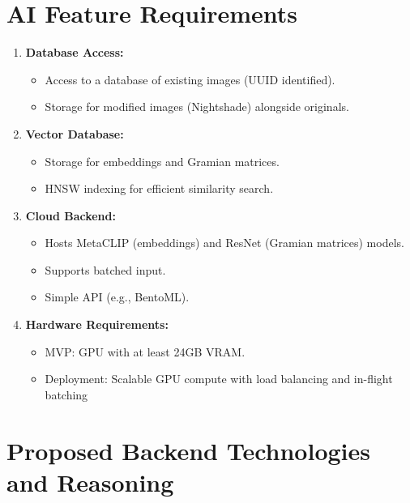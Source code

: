\section{AI Feature Requirements}
\begin{enumerate}
\item \textbf{Database Access:}
    \begin{itemize}
    \item Access to a database of existing images (UUID identified).
    \item Storage for modified images (Nightshade) alongside originals.
    \end{itemize}
\item \textbf{Vector Database:}
    \begin{itemize}
    \item Storage for embeddings and Gramian matrices.
    \item HNSW indexing for efficient similarity search.
    \end{itemize}

\item \textbf{Cloud Backend:}
    \begin{itemize}
    \item Hosts MetaCLIP (embeddings) and ResNet (Gramian matrices) models.
    \item Supports batched input.
    \item Simple API (e.g., BentoML).
    \end{itemize}

\item \textbf{Hardware Requirements:}
    \begin{itemize}
    \item MVP: GPU with at least 24GB VRAM.
    \item Deployment: Scalable GPU compute with load balancing and in-flight batching
    \end{itemize}
\end{enumerate}

\section{Proposed Backend Technologies and Reasoning}


